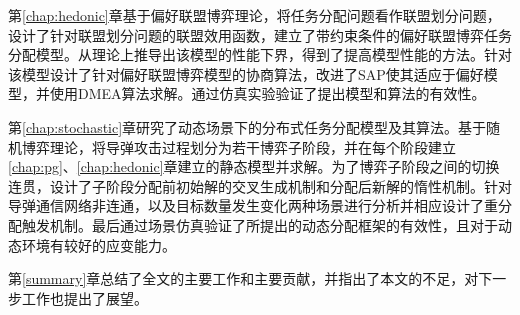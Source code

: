 第\ref{chap:hedonic}章基于偏好联盟博弈理论，将任务分配问题看作联盟划分问题，设计了针对联盟划分问题的联盟效用函数，建立了带约束条件的偏好联盟博弈任务分配模型。从理论上推导出该模型的性能下界，得到了提高模型性能的方法。针对该模型设计了针对偏好联盟博弈模型的协商算法，改进了SAP使其适应于偏好模型，并使用DMEA算法求解。通过仿真实验验证了提出模型和算法的有效性。

第\ref{chap:stochastic}章研究了动态场景下的分布式任务分配模型及其算法。基于随机博弈理论，将导弹攻击过程划分为若干博弈子阶段，并在每个阶段建立\ref{chap:pg}、\ref{chap:hedonic}章建立的静态模型并求解。为了博弈子阶段之间的切换连贯，设计了子阶段分配前初始解的交叉生成机制和分配后新解的惰性机制。针对导弹通信网络非连通，以及目标数量发生变化两种场景进行分析并相应设计了重分配触发机制。最后通过场景仿真验证了所提出的动态分配框架的有效性，且对于动态环境有较好的应变能力。

第\ref{summary}章总结了全文的主要工作和主要贡献，并指出了本文的不足，对下一步工作也提出了展望。







